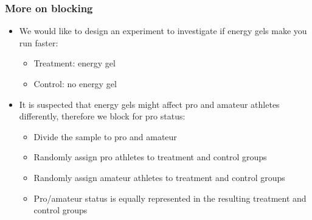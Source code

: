 \documentclass[slidestop,compress,mathserif]{beamer}
\begin{document}
\begin{frame}
	\frametitle{More on blocking}

	{
	\begin{center}
	\end{center}
	}
	{
	\begin{itemize}
		\item We would like to design an experiment to investigate if energy gels make you run faster:
		\pause
		\begin{itemize}
			\item Treatment: energy gel
			\item Control: no energy gel
		\end{itemize}
		\pause
		\item It is suspected that energy gels might affect pro and amateur athletes differently, therefore we block for pro status:
		\pause
		\begin{itemize}
			\item Divide the sample to pro and amateur
			\item Randomly assign pro athletes to treatment and control groups
			\item Randomly assign amateur athletes to treatment and control groups
			\item Pro/amateur status is equally represented in the resulting treatment and control groups
		\end{itemize}
	\end{itemize}
	}

	\pause

\end{frame}




\end{document}
